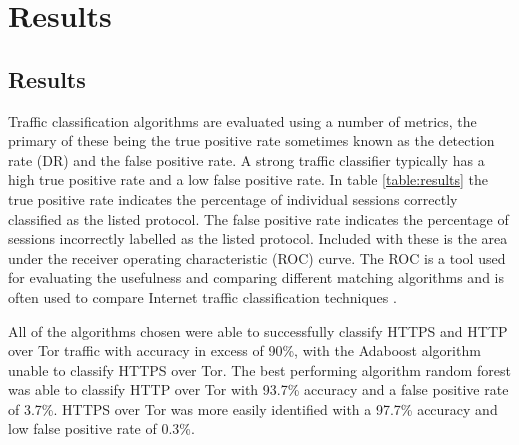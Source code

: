 \chapter{Results}

\section{Results}

Traffic classification algorithms are evaluated using a number of metrics, the
primary of these being the true positive rate sometimes known as the detection
rate (DR) and the false positive rate. A strong traffic classifier typically
has a high true positive rate and a low false positive rate. In table
\ref{table:results} the true positive rate indicates the percentage of
individual sessions correctly classified as the listed protocol. The false
positive rate indicates the percentage of sessions incorrectly labelled as the
listed protocol. Included with these is the area under the receiver operating
characteristic (ROC) curve. The ROC is a tool used for evaluating the
usefulness and comparing different matching algorithms and is often used to
compare Internet traffic classification techniques
\parencite{citeulike:167557,Nguyen:2008p3837}.

All of the algorithms chosen were able to successfully classify HTTPS and HTTP
over Tor traffic with accuracy in excess of 90\%, with the Adaboost algorithm
unable to classify HTTPS over Tor. The best performing algorithm random forest
was able to classify HTTP over Tor with 93.7\% accuracy and a false positive
rate of 3.7\%. HTTPS over Tor was more easily identified with a 97.7\% accuracy
and low false positive rate of 0.3\%.

